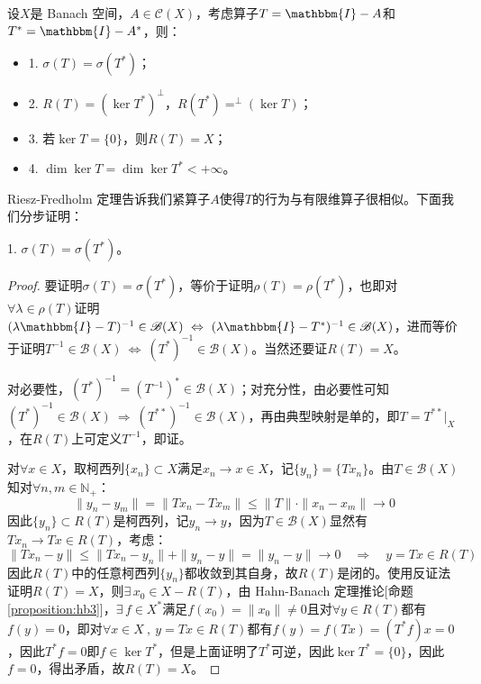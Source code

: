 \begin{theorem}\label{theorem:Riesz-Fredholm}
设$X$是 Banach 空间，$A \in \mathscr{C}(X)$，考虑算子$T=\mathbbm{I}-A$和$T^*=\mathbbm{I}-A^*$，则：
\begin{itemize}
\item 1. $\sigma(T)=\sigma(T^*)$；
\item 2. $R(T)=(\ker T^*)^{\perp}$，$R(T^*)=^{\perp}(\ker T)$；
\item 3. 若$\ker T=\{0\}$，则$R(T)=X$；
\item 4. $\dim\ker T=\dim\ker T^*<+\infty$。
\end{itemize}
\end{theorem}
\begin{remark}
\quad Riesz-Fredholm 定理告诉我们紧算子$A$使得$T$的行为与有限维算子很相似。下面我们分步证明：
\end{remark}
\begin{proposition}\label{proposition:pdj1}
1. $\sigma(T)=\sigma(T^*)$。
\end{proposition}
\begin{proof}
要证明$\sigma(T) = \sigma(T^*)$，等价于证明$\rho(T) = \rho(T^*)$，也即对$\forall \lambda \in \rho(T)$证明$(\lambda\mathbbm{I}-T)^{-1}\in\mathscr{B}(X) \ \Leftrightarrow \ (\lambda\mathbbm{I}-T^*)^{-1}\in\mathscr{B}(X)$，进而等价于证明$T^{-1}\in\mathscr{B}(X) \ \Leftrightarrow \ (T^*)^{-1}\in\mathscr{B}(X)$。当然还要证$R(T)=X$。

对必要性，$(T^*)^{-1}=(T^{-1})^*\in\mathscr{B}(X)$；对充分性，由必要性可知$(T^*)^{-1}\in\mathscr{B}(X) \ \Rightarrow \ (T^{**})^{-1}\in\mathscr{B}(X)$，再由典型映射是单的，即$T=T^{**}|_X$，在$R(T)$上可定义$T^{-1}$，即证。

对$\forall x \in X$，取柯西列$\{x_n\} \subset X$满足$x_n \to x \in X$，记$\{y_n\}=\{Tx_n\}$。由$T\in\mathscr{B}(X)$知对$\forall n,m \in \mathbb{N}_+$：
\[\|y_n-y_m\|=\|Tx_n-Tx_m\|\leq\|T\|\cdot\|x_n-x_m\| \to 0\]
因此$\{y_n\} \subset R(T)$是柯西列，记$y_n \to y$，因为$T\in\mathscr{B}(X)$显然有$Tx_n \to Tx \in R(T)$，考虑：
\[\|Tx_n-y\| \leq \|Tx_n-y_n\|+\|y_n-y\|=\|y_n-y\| \to 0 \quad \Rightarrow \quad y=Tx \in R(T)\]
因此$R(T)$中的任意柯西列$\{y_n\}$都收敛到其自身，故$R(T)$是闭的。使用反证法证明$R(T)=X$，则$\exists \, x_0 \in X-R(T)$，由 Hahn-Banach 定理推论[命题\ref{proposition:hb3}]，$\exists \, f \in X^*$满足$f(x_0)=\|x_0\|\neq 0$且对$\forall y \in R(T)$都有$f(y)=0$，即对$\forall x \in X \ , \ y=Tx \in R(T)$都有$f(y)=f(Tx)=(T^*f)x=0$，因此$T^*f=0$即$f \in \ker T^*$，但是上面证明了$T^*$可逆，因此$\ker T^*=\{0\}$，因此$f=0$，得出矛盾，故$R(T)=X$。
\end{proof}

